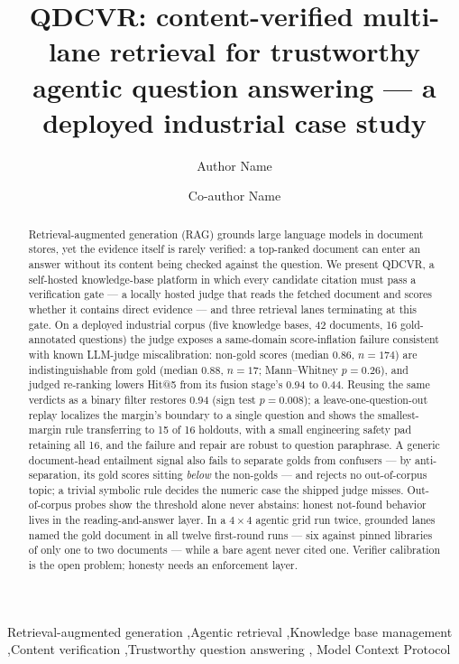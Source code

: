 \documentclass[preprint,12pt]{elsarticle}
\begin{document}
\begin{frontmatter}

\title{QDCVR: content-verified multi-lane retrieval for trustworthy agentic
question answering --- a deployed industrial case study}

\author[inst1]{Author Name}
\author[inst1]{Co-author Name}

\begin{abstract}
Retrieval-augmented generation (RAG) grounds large language models in
document stores, yet the evidence itself is rarely verified: a top-ranked
document can enter an answer without its content being checked against the
question. We present QDCVR, a self-hosted knowledge-base platform in which
every candidate citation must pass a verification gate --- a locally hosted
judge that reads the fetched document and scores whether it contains direct
evidence --- and three retrieval lanes terminating at this gate. On a
deployed industrial corpus (five knowledge bases, 42 documents, 16
gold-annotated questions) the judge exposes a same-domain score-inflation
failure consistent with known LLM-judge miscalibration: non-gold scores
(median 0.86, $n = 174$) are indistinguishable from gold (median 0.88,
$n = 17$; Mann--Whitney $p = 0.26$), and judged re-ranking lowers Hit@5
from its fusion stage's 0.94 to 0.44. Reusing the same verdicts as a binary
filter restores 0.94 (sign test $p = 0.008$); a leave-one-question-out
replay localizes the margin's boundary to a single question and shows the
smallest-margin rule transferring to 15 of 16 holdouts, with a small
engineering safety pad retaining all 16, and the failure and repair are
robust to question paraphrase. A generic document-head entailment signal
also fails to separate golds from confusers --- by anti-separation, its
gold scores sitting \emph{below} the non-golds --- and rejects no
out-of-corpus topic; a trivial symbolic rule decides the numeric case the
shipped judge misses. Out-of-corpus probes show
the threshold alone never abstains: honest not-found behavior lives in the
reading-and-answer layer. In a $4\times4$ agentic grid run twice, grounded
lanes named the gold document in all twelve first-round runs --- six
against pinned libraries of only one to two documents --- while a bare
agent never cited one. Verifier calibration is the open problem; honesty
needs an enforcement layer.
\end{abstract}

\begin{keyword}
Retrieval-augmented generation \sep Agentic retrieval \sep Knowledge base
management \sep Content verification \sep Trustworthy question answering \sep
Model Context Protocol
\end{keyword}

\end{frontmatter}
\end{document}
